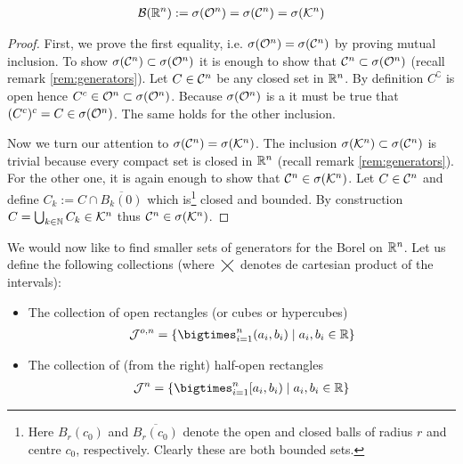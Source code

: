 \begin{thm}
	\begin{align*}
		\mathcal{B}(\mathbb{R}^n) := \sigma(\mathcal{O}^n) = \sigma(\mathcal{C}^n) = \sigma(\mathcal{K}^n)
	\end{align*}
	
	\begin{proof}
		First, we prove the first equality, i.e. $\sigma(\mathcal{O}^n) = \sigma(\mathcal{C}^n)$ by proving mutual inclusion. To show $\sigma(\mathcal{C}^n) \subset \sigma(\mathcal{O}^n)$ it is enough to show that $\mathcal{C}^n \subset \sigma(\mathcal{O}^n)$ (recall remark \ref{rem:generators}). Let $C \in \mathcal{C}^n$ be any closed set in $\mathbb{R}^n$. By definition $C^\complement$ is open hence $C^c \in \mathcal{O}^n \subset \sigma(\mathcal{O}^n)$. Because $\sigma(\mathcal{O}^n)$ is a \siga it must be true that $(C^c)^c = C \in \sigma(\mathcal{O}^n)$. The same holds for the other inclusion.
		
		Now we turn our attention to $\sigma(\mathcal{C}^n) = \sigma(\mathcal{K}^n)$. The inclusion $\sigma(\mathcal{K}^n) \subset \sigma (\mathcal{C}^n)$ is trivial because every compact set is closed in $\mathbb{R}^n$ (recall remark \ref{rem:generators}). For the other one, it is again enough to show that $\mathcal{C}^n \in \sigma(\mathcal{K}^n)$. Let $C \in \mathcal{C}^n$ and define $C_k := C \cap \overline{B_k(0)}$ which is\footnote{Here $B_r(c_0)$ and $\overline{B_r(c_0)}$ denote the open and closed balls of radius $r$ and centre $c_0$, respectively. Clearly these are both bounded sets.} closed and bounded. By construction $C = \bigcup_{k \in \mathbb{N}} C_k \in \mathcal{K}^n$ thus $\mathcal{C}^n \in \sigma(\mathcal{K}^n)$.
	\end{proof}
\end{thm}

We would now like to find smaller sets of generators for the Borel \siga on $\mathbb{R}^n$. Let us define the following collections (where $\bigtimes$ denotes de cartesian product of the intervals):

\newcommand{\calJ}{\mathcal{J}}
\begin{itemize}
	\item The collection of open rectangles (or cubes or hypercubes)
	\begin{align*}
		\calJ^{o,n} = \{\bigtimes_{i = 1}^n (a_i, b_i) \mid a_i, b_i \in \R\}
	\end{align*}
	\item The collection of (from the right) half-open rectangles
	\begin{align*}
		\calJ^{n} = \{\bigtimes_{i = 1}^n [a_i, b_i) \mid a_i, b_i \in \R\}
	\end{align*}
\end{itemize}


